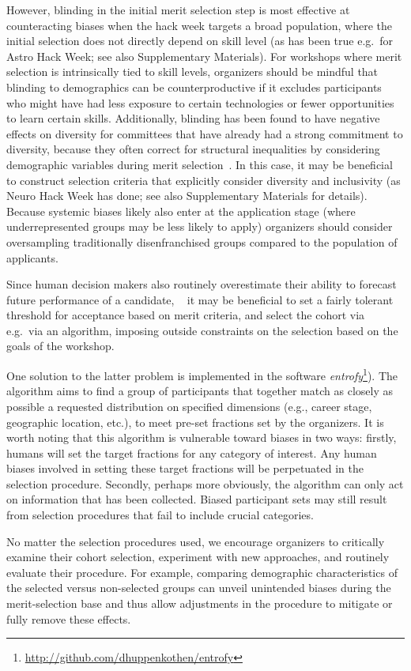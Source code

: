 However, blinding in the initial merit selection step is most effective at counteracting biases when the hack week targets a broad population, where the initial selection does not directly depend on skill level (as has been true e.g.\ for Astro Hack Week; see also Supplementary Materials). 
For workshops where merit selection is intrinsically tied to skill levels, organizers should be mindful that blinding to demographics can be counterproductive if it excludes participants who might have had less exposure to certain technologies or fewer opportunities to learn certain skills. Additionally, blinding has been found to have negative effects on diversity for committees that have already had a strong commitment to diversity, because they often correct for structural inequalities by considering demographic variables during merit selection~\cite{behaghel2015unintended}.
In this case, it may be beneficial to construct selection criteria that explicitly consider diversity and inclusivity (as Neuro Hack Week has done; see also Supplementary Materials for details). 
Because systemic biases likely also enter at the application stage (where underrepresented groups may be less likely to apply) organizers should consider oversampling traditionally disenfranchised groups compared to the population of applicants. 

Since human decision makers also routinely overestimate their ability to forecast future performance of a candidate, ~\cite{highhouse2008} it may be beneficial to set a fairly tolerant threshold for acceptance based on merit criteria, and select the cohort via e.g.\ via an algorithm, imposing outside constraints on the selection based on the goals of the workshop. 

One solution to the latter problem is implemented in the software \textit{entrofy}\footnote{\url{http://github.com/dhuppenkothen/entrofy}}). 
The algorithm aims to find a group of participants that together match as closely as possible a requested distribution on specified dimensions (e.g., career stage, geographic location, etc.), to meet pre-set fractions set by the organizers.
It is worth noting that this algorithm is vulnerable toward biases in two ways: firstly, humans will set the target fractions for any category of interest.  
Any human biases involved in setting these target fractions will be perpetuated in the selection procedure. 
Secondly, perhaps more obviously, the algorithm can only act on information that has been collected.
Biased participant sets may still result from selection procedures that fail to include crucial categories. 

No matter the selection procedures used, we encourage organizers to critically examine their cohort selection, experiment with new approaches, and routinely evaluate their procedure. For example, comparing demographic characteristics of the selected versus non-selected groups can unveil unintended biases during the merit-selection base and thus allow adjustments in the procedure to mitigate or fully remove these effects.
